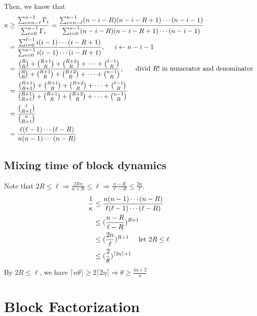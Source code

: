 \documentclass{article}
\begin{document}
Then, we know that
\begin{align*}
  \kappa &\geq \frac{\sum_{i=n-\ell}^{n-1}\Gamma_i}{\sum_{i=0}^{n-1}\Gamma_i} = \frac{\sum_{i=n-\ell}^{n-1}(n-i-R)(n-i-R+1)\cdots(n-i-1)}{\sum_{i=0}^{n-1}(n-i-R)(n-i-R+1)\cdots(n-i-1)} \\
         &= \frac{\sum_{i=0}^{\ell-1}i(i-1)\cdots(i-R+1)}{\sum_{i=0}^{n-1}i(i-1)\cdots(i-R+1)}, \hspace{0.5cm} i\gets n - i - 1 \\
         &= \frac{\binom{R}{R} + \binom{R+1}{R} + \binom{R+2}{R} + \cdots + \binom{\ell-1}{R}}{\binom{R}{R} + \binom{R+1}{R} + \binom{R+2}{R} + \cdots + \binom{n-1}{R}} ,\hspace{0.5cm} \mbox{ divid $R!$ in numerator and denominator} \\
         &= \frac{\binom{R+1}{R+1} + \binom{R+1}{R} + \binom{R+2}{R} + \cdots + \binom{\ell-1}{R}}{\binom{R+1}{R+1} + \binom{R+1}{R} + \binom{R+2}{R} + \cdots + \binom{n-1}{R}} \\
         &=\frac{\binom{\ell}{R+1}}{\binom{n}{R+1}} \\
         &=\frac{\ell(\ell-1)\cdots(\ell-R)}{n(n-1)\cdots(n-R)} \\
\end{align*}

\subsection{Mixing time of block dynamics}
Note that $2R \leq \ell \Rightarrow \frac{2Rn}{n + R} \leq \ell \Rightarrow \frac{n-R}{\ell - R} \leq \frac{2n}{\ell}$.
\begin{align*}
  \frac{1}{\kappa}
  &\leq \frac{n(n-1)\cdots (n - R)}{\ell(\ell-1)\cdots(\ell-R)} \\
  &\leq (\frac{n-R}{\ell-R})^{R+1} \\
  &\leq (\frac{2n}{\ell})^{R+1} \hspace{0.5cm} \mbox{let $2R \leq \ell$}\\
  &\leq (\frac{2}{\theta})^{\lceil 2\eta \rceil + 1}
\end{align*}
By $2R \leq \ell$, we have $\lceil n\theta \rceil \geq 2\lceil 2\eta \rceil \Rightarrow \theta \geq \frac{4\eta + 2}{n}$

\section{Block Factorization}
\end{document}

